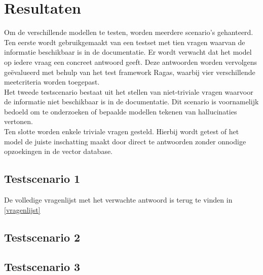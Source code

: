 
\chapter{Resultaten}
\label{ch:resultaten}

Om de verschillende modellen te testen, worden meerdere scenario’s gehanteerd.
Ten eerste wordt gebruikgemaakt van een testset met tien vragen waarvan de informatie beschikbaar is in de documentatie. Er wordt verwacht dat het model op iedere vraag een concreet antwoord geeft. Deze antwoorden worden vervolgens geëvalueerd met behulp van het test framework Ragas, waarbij vier verschillende meetcriteria worden toegepast.
\\[1em]
Het tweede testscenario bestaat uit het stellen van niet-triviale vragen waarvoor de informatie niet beschikbaar is in de documentatie. Dit scenario is voornamelijk bedoeld om te onderzoeken of bepaalde modellen tekenen van hallucinaties vertonen.
\\[1em]
Ten slotte worden enkele triviale vragen gesteld. Hierbij wordt getest of het model de juiste inschatting maakt door direct te antwoorden zonder onnodige opzoekingen in de vector database.

\section{Testscenario 1}

De volledige vragenlijst met het verwachte antwoord is terug te vinden in \ref{vragenlijst}


\section{Testscenario 2}

\section{Testscenario 3}